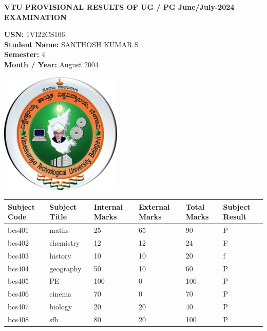 \documentclass[a4paper,12pt]{article}
\begin{document}
\begin{center}
    \textbf{VTU PROVISIONAL RESULTS OF UG / PG June/July-2024 EXAMINATION}
\end{center}

\vspace{0.5cm}
\noindent
\begin{minipage}{0.7\textwidth}
\textbf{USN:} 1VI22CS106 \\
\textbf{Student Name:} SANTHOSH KUMAR S\\
\textbf{Semester: } 4\\
\textbf{Month / Year: } August 2004
\end{minipage}
\begin{minipage}{0.2\textwidth}
    \includegraphics[width=\textwidth]{vtulogo.png}
\end{minipage}
\vspace{0.5cm}

\begin{center}
\begin{tabular}{|m{2cm}|m{7cm}|m{2cm}|m{2cm}|m{2cm}|m{2cm}|}
    \hline
    \textbf{Subject Code} & \textbf{Subject Title} & \textbf{Internal Marks} & \textbf{External Marks} & \textbf{Total Marks} & \textbf{Subject Result} \\
    \hline
    bcs401 & maths & 25 & 65 & 90 & P \\ \hline
    bcs402 & chemistry & 12 & 12 & 24 & F \\ \hline
    bcs403 & history & 10 & 10 & 20 & f \\ \hline
    bcs404 & geography & 50 & 10 & 60 & P \\ \hline
    bcs405 & PE & 100 & 0 & 100 & P \\ \hline
    bcs406 & cinema & 70 & 0 & 70 & P \\ \hline
    bcs407 & biology & 20 & 20 & 40 & P \\ \hline
    bcs408 & sfh & 80 & 20 & 100 & P \\ \hline
    \end{tabular}
\end{center}
\end{document}
